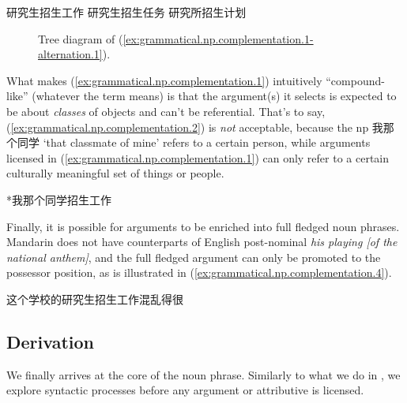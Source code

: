 \documentclass[UTF8, a4paper, oneside, scheme=plain, 12pt]{ctexrep}
\newcommand{\form}[1]{\emph{#1}}
\newcommand{\translate}[1]{`#1'}
\begin{document}
\begin{exe}
    \ex\label{ex:grammatical.np.complementation.3} \begin{xlist}
        \ex\label{ex:grammatical.np.complementation.3.1} 研究生招生工作
        \ex 研究生招生任务
        \ex 研究所招生计划
    \end{xlist}
\end{exe}

\begin{figure}[H]
    \centering
    {
        \small
        
    }
    \caption{Tree diagram of (\ref{ex:grammatical.np.complementation.1-alternation.1}).}
    \label{fig:grammatical.np.complementation.1-alternation.1}
\end{figure}

What makes (\ref{ex:grammatical.np.complementation.1}) intuitively ``compound-like'' (whatever the term means) is that
the argument(s) it selects is expected to be about \emph{classes} of objects and can't be referential.
That's to say, (\ref{ex:grammatical.np.complementation.2})
is \emph{not} acceptable, because the \ac{np} 我那个同学 \translate{that classmate of mine}
refers to a certain person, while arguments licensed in (\ref{ex:grammatical.np.complementation.1})
can only refer to a certain culturally meaningful set of things or people.

\begin{exe}
    \ex\label{ex:grammatical.np.complementation.2} *我那个同学招生工作
\end{exe}

Finally, it is possible for arguments to be enriched into full fledged noun phrases.
Mandarin does not have counterparts of English post-nominal \form{his playing [of the national anthem]},
and the full fledged argument can only be promoted to the possessor position,
as is illustrated in (\ref{ex:grammatical.np.complementation.4}).

\begin{exe}
    \ex\label{ex:grammatical.np.complementation.4} 这个学校的研究生招生工作混乱得很
\end{exe}

\subsection{Derivation}\label{sec:grammatical.np.derivation}

We finally arrives at the core of the noun phrase.
Similarly to what we do in ,
we explore syntactic processes before any argument or attributive is licensed.
\end{document}
